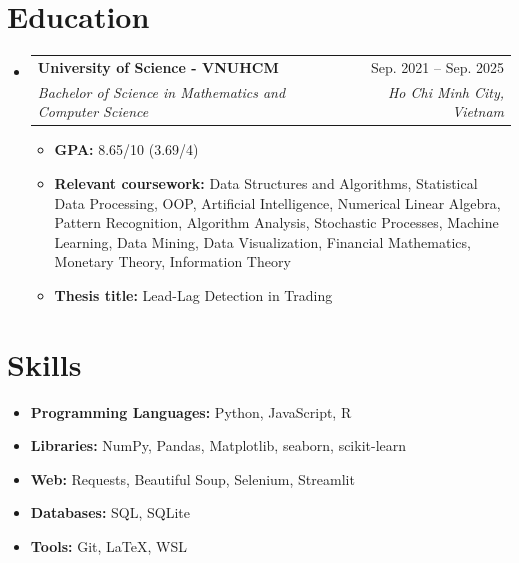 \documentclass[letterpaper,11pt]{article}
\makeatletter
\newcommand{\heading}[4]{
    \normalsize
    \begin{tabular*}{0.97\textwidth}[t]{l@{\extracolsep{\fill}}r}
      \textbf{#1} & #2 \\[-2pt]
      \textit{\small#3} & \textit{\small #4}
    \end{tabular*}
    \vspace{-2pt}
}
\makeatother
\begin{document}
\section{Education}
\begin{itemize}
    \item \heading{University of Science - VNUHCM}{Sep. 2021 -- Sep. 2025}
      {Bachelor of Science in Mathematics and Computer Science}{Ho Chi Minh City, Vietnam}
    \begin{itemize}
        \item \textbf{GPA:} 8.65/10 (3.69/4)
        \item \textbf{Relevant coursework:}
        Data Structures and Algorithms, 
        Statistical Data Processing, 
        OOP, %
        Artificial Intelligence,
        Numerical Linear Algebra,
        Pattern Recognition,
        Algorithm Analysis,
        Stochastic Processes,
        Machine Learning,
        Data Mining,
        Data Visualization,
        Financial Mathematics, 
        Monetary Theory,
        Information Theory
        \item \textbf{Thesis title:} Lead-Lag Detection in Trading
    \end{itemize}
\end{itemize}


\section{Skills}
\begin{itemize}
    \item \textbf{Programming Languages:} 
    Python, 
    JavaScript, 
    R
    
    \item \textbf{Libraries:} 
    NumPy, Pandas, Matplotlib, 
    seaborn, 
    scikit-learn
    
    \item \textbf{Web:} 
    Requests, 
    Beautiful Soup, 
    Selenium, 
    Streamlit

    \item \textbf{Databases:} SQL, SQLite

    \item \textbf{Tools:} 
    Git, 
    LaTeX, 
    WSL 

\end{itemize}
\end{document}
